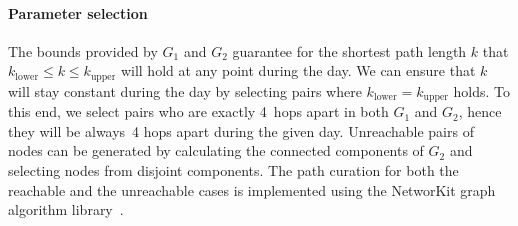 \paragraph{Parameter selection}
The bounds provided by $G_1$ and $G_2$ guarantee for the shortest path length $k$ that $k_\mathrm{lower} \leq k \leq k_\mathrm{upper}$ will hold at any point during the day.
We can ensure that $k$ will stay constant during the day by selecting \Person pairs where $k_\mathrm{lower} = k_\mathrm{upper}$ holds.
To this end, we select pairs who are exactly 4~hops apart in both $G_1$ and $G_2$, hence they will be always~4 hops apart during the given day.
Unreachable pairs of nodes can be generated by calculating the connected components of $G_2$ and selecting nodes from disjoint components.
The path curation for both the reachable and the unreachable cases is implemented using the NetworKit graph algorithm library~\cite{lit:networkit}.

